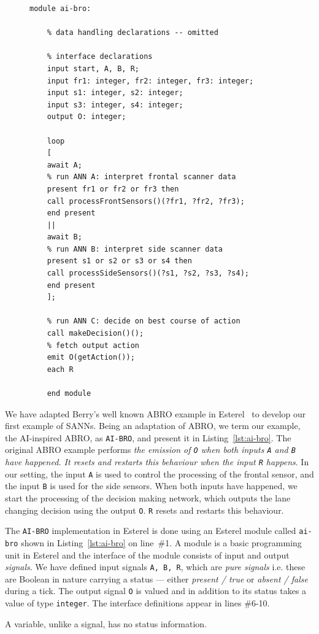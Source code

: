 \begin{figure}[htb]
	\begin{lstlisting}[caption={Esterel implementation of \texttt{AI-BRO}},label={lst:ai-bro}]
	module ai-bro:
	
	% data handling declarations -- omitted 
	
	% interface declarations
	input start, A, B, R;
	input fr1: integer, fr2: integer, fr3: integer;
	input s1: integer, s2: integer;
	input s3: integer, s4: integer;
	output O: integer;
	
	loop
	[
	await A;
	% run ANN A: interpret frontal scanner data
	present fr1 or fr2 or fr3 then
	call processFrontSensors()(?fr1, ?fr2, ?fr3);
	end present
	||
	await B;
	% run ANN B: interpret side scanner data
	present s1 or s2 or s3 or s4 then
	call processSideSensors()(?s1, ?s2, ?s3, ?s4);
	end present
	];
	
	% run ANN C: decide on best course of action 
	call makeDecision()();
	% fetch output action
	emit O(getAction());
	each R
	
	end module
	\end{lstlisting}
\end{figure}

We have adapted Berry's well known ABRO example in Esterel~\cite{berry2000foundations} to develop our first example of 
\acp{SANN}. Being an adaptation of ABRO, we term our example, the AI-inspired ABRO, as \texttt{AI-BRO}, and present it in Listing~\ref{lst:ai-bro}.
The original ABRO example performs \emph{the emission of \texttt{O} when both inputs \texttt{A} and \texttt{B} 
	have happened. It resets and restarts this behaviour when the input \texttt{R} happens}. In our setting, the input 
\texttt{A} is used to control the processing of the frontal sensor, and the input \texttt{B} is used for the side sensors.
When both inputs have happened, we start the processing of the decision making network, which outputs the 
lane changing decision using the output \texttt{O}. \texttt{R} resets and restarts this behaviour.

The \texttt{AI-BRO} implementation in Esterel is done using an Esterel module called \texttt{ai-bro} shown in Listing~\ref{lst:ai-bro} on line~\#1.
A module is a basic programming unit in Esterel and the interface of the module consists of input and
output \emph{signals}. We have defined input signals \texttt{A, B, R}, which are \emph{pure signals}
i.e. these are Boolean in nature carrying a status --- either \emph{present / true} or \emph{absent / false} during a tick. The output signal 
\texttt{O} is valued and in addition to its status takes a value of type \texttt{integer}. The interface definitions appear in 
lines \#6-10. %
A variable, unlike a signal, has no status information. 

